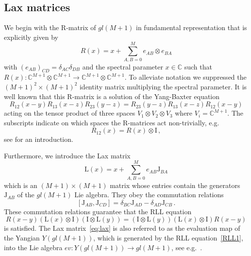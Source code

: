 \documentclass[11pt]{article}
\numberwithin{equation}{section}
\newcommand{\M}{M}
\newcommand{\ID}{\mathrm{I}}
\newcommand{\fundR}{R}
\begin{document}
	\subsection{Lax matrices}
    
    We begin with the R-matrix of $gl(\M+1)$ in fundamental representation that is  explicitly given by
	\begin{equation}\label{fundamental-R}
		\fundR(x)=x+\sum_{A,B=0}^{\M} e_{AB}\otimes e_{BA}
	\end{equation}
	with $(e_{AB})_{CD}=\delta_{AC}\delta_{DB}$ and the spectral parameter $x\in\mathbb{C}$ such that  $\fundR(x):\mathbb{C}^{\M+1}\otimes \mathbb{C}^{\M+1}\to \mathbb{C}^{\M+1}\otimes \mathbb{C}^{\M+1}$. To alleviate notation we suppressed the $(\M+1)^2\times(\M+1)^2$ identity matrix multiplying the spectral parameter. It is well known that this R-matrix is a solution of the Yang-Baxter equation
	\begin{equation}
	 \fundR_{12}(x-y)\fundR_{13}(x-z)\fundR_{23}(y-z)=\fundR_{23}(y-z)\fundR_{13}(x-z)\fundR_{12}(x-y)
	\end{equation}
	acting on the tensor product of three spaces $V_1\otimes V_2\otimes V_3$ where $V_i=\mathbb{C}^{\M+1}$. The subscripts indicate on which spaces the R-matrices act non-trivially, e.g.
\begin{equation}
 \fundR_{12}(x)=\fundR(x)\otimes \ID\,,
\end{equation}
see \cite{Faddeev:1996iy} for an introduction.

Furthermore, we introduce the Lax matrix
	\begin{equation}\label{eq:lax}
		\mathrm{L}(x)=x+\sum_{A,B=0}^{\M} e_{AB} \mathrm{J}_{BA}
	\end{equation}
	which is an $(\M+1)\times(\M+1)$ matrix whose entries contain the generators $\mathrm{J}_{AB}$ of the  $gl(\M+1)$ Lie algebra. They obey the commutation relations
	\begin{equation}\label{gl-commutators}
[\mathrm{J}_{AB},\mathrm{J}_{CD}]=\delta_{BC}\mathrm{J}_{AD}-\delta_{AD}\mathrm{J}_{CB}\,.
	\end{equation}
    These commutation relations guarantee that the RLL equation
	\begin{equation}\label{RLL1}
		\fundR(x-y)(\mathrm{L}(x)\otimes\ID)(\ID\otimes \mathrm{L}(y))=(\ID\otimes \mathrm{L}(y))(\mathrm{L}(x)\otimes\ID)\fundR(x-y)
	\end{equation}
is satisfied. The Lax matrix~\eqref{eq:lax} is also referred to as the evaluation map of the Yangian $Y(gl(M+1))$, which is generated by the RLL equation~\eqref{RLL1}, into the Lie algebra $ev:Y(gl(M+1))\to gl(M+1)$, see e.g.~\cite{molev2003yangians}.
\end{document}
